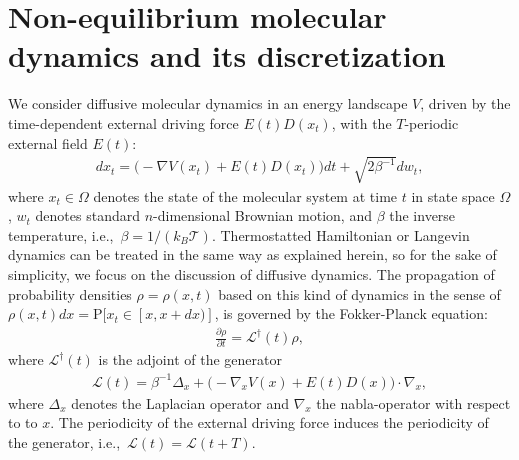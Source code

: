 \documentclass[journal=jctcce,manuscript=article]{achemso}
\newcommand{\vect}[1]{#1}
\newcommand{\ml}[0]{\mathcal {L}}
\newcommand{\prob}{\textrm{P}}
\begin{document}
\section{Non-equilibrium molecular dynamics and its discretization}
\label{sec:disc}
We consider diffusive molecular dynamics in an energy landscape $V$, driven by the time-dependent external driving force $E(t)D(x_t)$, with the
$T$-periodic external field $E(t)$:
\begin{align}
  \label{eq:disc-1}
  d\vect x_t = \Big(-\nabla V(\vect x_t) + E(t) D(\vect x_t)\Big)dt + \sqrt{2\beta^{-1}} d\vect w_t, 
\end{align}
where $x_t\in\Omega$ denotes the state of the molecular system at time $t$ in state space $\Omega$, $\vect w_t$ denotes standard $n$-dimensional Brownian motion, and $\beta$ the inverse temperature,
i.e.,~$\beta = 1/(k_B\mathcal T)$.
Thermostatted Hamiltonian or Langevin dynamics can be treated in the same way as explained herein, so for the sake of simplicity, we focus on the discussion of diffusive dynamics.
The propagation of probability
densities $\rho=\rho(\vect x,t)$ based on this kind of dynamics in the sense
of $\rho(\vect x,t)dx=\prob[\vect x_t\in [\vect x,\vect x+d\vect x)]$, is governed by
the Fokker-Planck equation:
\begin{align}
  \label{eq:disc-fp}
  \frac{\partial \rho}{\partial t} = \ml^\dagger(t) \rho,
\end{align}
where $\ml^\dagger(t)$ is the adjoint of the generator
\begin{align}
  \label{eq:disc-3}
  \ml(t)=\beta^{-1}\Delta_{\vect x}+\Big(-\nabla_x V(\vect x) + E(t)D(\vect x)\Big)\cdot\nabla_{\vect x},
\end{align}
where $\Delta_{\vect x}$ denotes the Laplacian operator and $\nabla_{\vect x}$
the nabla-operator with respect to to $\vect x$. 
The periodicity of the external driving force induces the periodicity of the generator,
i.e.,~$\ml(t) = \ml(t+T)$.  

\end{document}
